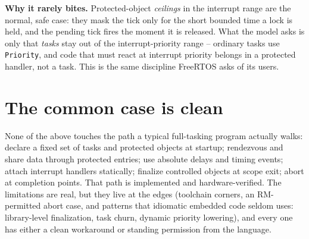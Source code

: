 \textbf{Why it rarely bites.} Protected-object \emph{ceilings} in the
interrupt range are the normal, safe case: they mask the tick only for the
short bounded time a lock is held, and the pending tick fires the moment it is
released. What the model asks is only that \emph{tasks} stay out of the
interrupt-priority range -- ordinary tasks use \texttt{Priority}, and code
that must react at interrupt priority belongs in a protected handler, not a
task. This is the same discipline FreeRTOS asks of its users.

\section{The common case is clean}

None of the above touches the path a typical full-tasking program actually walks:
declare a fixed set of tasks and protected objects at startup; rendezvous and
share data through protected entries; use absolute delays and timing events;
attach interrupt handlers statically; finalize controlled objects at scope exit;
abort at completion points. That path is implemented and hardware-verified. The
limitations are real, but they live at the edges (toolchain corners, an
RM-permitted abort case, and patterns that idiomatic embedded code seldom uses:
library-level finalization, task churn, dynamic priority lowering), and every
one has either a clean workaround or standing permission from the language.
